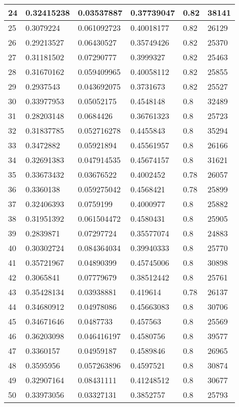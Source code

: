 \begin{longtable}{|l|l|l|l|l|l|}
24 & 0.32415238 & 0.03537887 & 0.37739047 & 0.82 & 38141 \\ \hline 
25 & 0.3079224 & 0.061092723 & 0.40018177 & 0.82 & 26129 \\ \hline 
26 & 0.29213527 & 0.06430527 & 0.35749426 & 0.82 & 25370 \\ \hline 
27 & 0.31181502 & 0.07290777 & 0.3999327 & 0.82 & 25463 \\ \hline 
28 & 0.31670162 & 0.059409965 & 0.40058112 & 0.82 & 25855 \\ \hline 
29 & 0.2937543 & 0.043692075 & 0.3731673 & 0.82 & 25527 \\ \hline 
30 & 0.33977953 & 0.05052175 & 0.4548148 & 0.8 & 32489 \\ \hline 
31 & 0.28203148 & 0.0684426 & 0.36761323 & 0.8 & 25723 \\ \hline 
32 & 0.31837785 & 0.052716278 & 0.4455843 & 0.8 & 35294 \\ \hline 
33 & 0.3472882 & 0.05921894 & 0.45561957 & 0.8 & 26166 \\ \hline 
34 & 0.32691383 & 0.047914535 & 0.45674157 & 0.8 & 31621 \\ \hline 
35 & 0.33673432 & 0.03676522 & 0.4002452 & 0.78 & 26057 \\ \hline 
36 & 0.3360138 & 0.059275042 & 0.4568421 & 0.78 & 25899 \\ \hline 
37 & 0.32406393 & 0.0759199 & 0.4000977 & 0.8 & 25882 \\ \hline 
38 & 0.31951392 & 0.061504472 & 0.4580431 & 0.8 & 25905 \\ \hline 
39 & 0.2839871 & 0.07297724 & 0.35577074 & 0.8 & 24883 \\ \hline 
40 & 0.30302724 & 0.084364034 & 0.39940333 & 0.8 & 25770 \\ \hline 
41 & 0.35721967 & 0.04890399 & 0.45745006 & 0.8 & 30898 \\ \hline 
42 & 0.3065841 & 0.07779679 & 0.38512442 & 0.8 & 25761 \\ \hline 
43 & 0.35428134 & 0.03938881 & 0.419614 & 0.78 & 26137 \\ \hline 
44 & 0.34680912 & 0.04978086 & 0.45663083 & 0.8 & 30706 \\ \hline 
45 & 0.34671646 & 0.0487733 & 0.457563 & 0.8 & 25569 \\ \hline 
46 & 0.36203098 & 0.046416197 & 0.4580756 & 0.8 & 39577 \\ \hline 
47 & 0.3360157 & 0.04959187 & 0.4589846 & 0.8 & 26965 \\ \hline 
48 & 0.3595956 & 0.057263896 & 0.4597521 & 0.8 & 30874 \\ \hline 
49 & 0.32907164 & 0.08431111 & 0.41248512 & 0.8 & 30677 \\ \hline 
50 & 0.33973056 & 0.03327131 & 0.3852757 & 0.8 & 25793 \\ \hline 
\end{longtable}